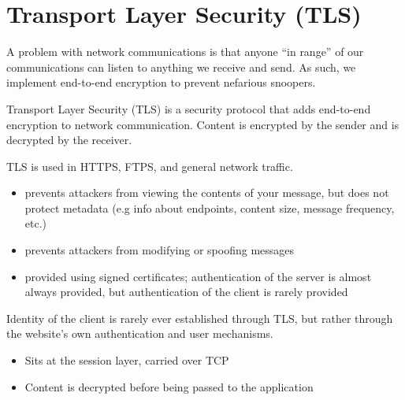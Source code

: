 \section{Transport Layer Security (TLS)}

A problem with network communications is that anyone ``in range'' of our communications can listen to anything we receive and send. As such, we implement end-to-end encryption to prevent nefarious snoopers.

\begin{dfnbox}{Transport Layer Security (TLS)}{}
     is a security protocol that adds end-to-end encryption to network communication. Content is encrypted by the sender and is decrypted by the receiver.
\end{dfnbox}

TLS is used in HTTPS, FTPS, and general network traffic.

\begin{itemize}
    \item {} prevents attackers from viewing the contents of your message, but does not protect metadata (e.g info about endpoints, content size, message frequency, etc.)
    \item {} prevents attackers from modifying or spoofing messages
    \item {} provided using signed certificates; authentication of the server is almost always provided, but authentication of the client is rarely provided
\end{itemize}

Identity of the client is rarely ever established through TLS, but rather through the website's own authentication and user mechanisms.
\begin{itemize}
    \item Sits at the session layer, carried over TCP
    \item Content is decrypted before being passed to the application
\end{itemize}

